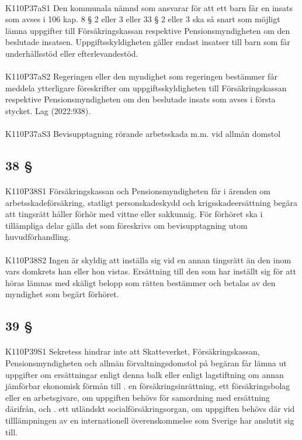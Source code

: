 \documentclass[a4paper,notitlepage,openany,10pt]{book}
\begin{document}
\paragraph*{}
{\tiny K110P37aS1}
Den kommunala nämnd som ansvarar för att ett barn får en insats som avses i 106 kap. 8 § 2 eller 3 eller 33 § 2 eller 3 ska så snart som möjligt lämna uppgifter till Försäkringskassan respektive Pensionsmyndigheten om den beslutade insatsen. Uppgiftsskyldigheten gäller endast insatser till barn som får underhållsstöd eller efterlevandestöd.
\paragraph*{}
{\tiny K110P37aS2}
Regeringen eller den myndighet som regeringen bestämmer får meddela ytterligare föreskrifter om uppgiftsskyldigheten till Försäkringskassan respektive Pensionsmyndigheten om den beslutade insats som avses i första stycket.
Lag (2022:938).
\paragraph*{}
{\tiny K110P37aS3}
Bevisupptagning rörande arbetsskada m.m. vid allmän domstol
\subsection*{38 §}
\paragraph*{}
{\tiny K110P38S1}
Försäkringskassan och Pensionsmyndigheten får i ärenden om arbetsskadeförsäkring, statligt personskadeskydd och krigsskadeersättning begära att tingsrätt håller förhör med vittne eller sakkunnig. För förhöret ska i tillämpliga delar gälla det som föreskrivs om bevisupptagning utom huvudförhandling.
\paragraph*{}
{\tiny K110P38S2}
Ingen är skyldig att inställa sig vid en annan tingsrätt än den inom vars domkrets han eller hon vistas. Ersättning till den som har inställt sig för att höras lämnas med skäligt belopp som rätten bestämmer och betalas av den myndighet som begärt förhöret.
\subsection*{39 §}
\paragraph*{}
{\tiny K110P39S1}
Sekretess hindrar inte att Skatteverket, Försäkringskassan, Pensionsmyndigheten och allmän förvaltningsdomstol på begäran får lämna ut uppgifter om ersättningar enligt denna balk eller enligt lagstiftning om annan jämförbar ekonomisk förmån till
. en försäkringsinrättning, ett försäkringsbolag eller en arbetsgivare, om uppgiften behövs för samordning med ersättning därifrån, och
. ett utländskt socialförsäkringsorgan, om uppgiften behövs där vid tilllämpningen av en internationell överenskommelse som Sverige har anslutit sig till.
\end{document}
